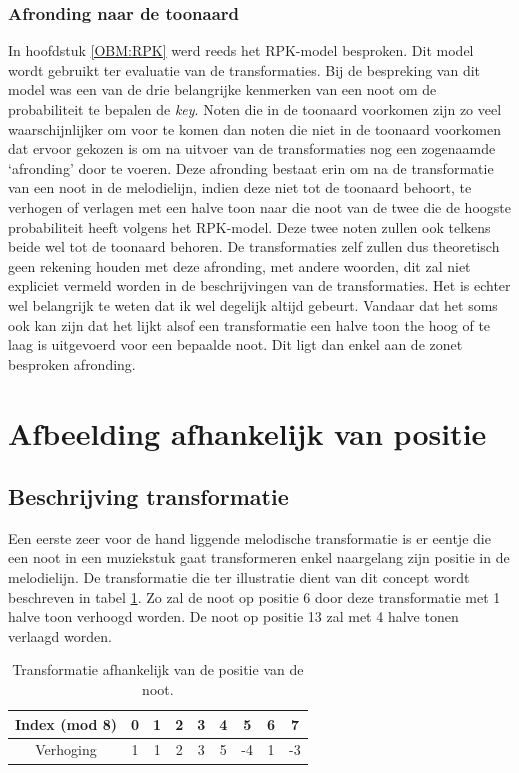 \subsubsection{Afronding naar de toonaard}
\label{sub:afronding}
In hoofdstuk \ref{OBM:RPK} werd reeds het RPK-model besproken. Dit model wordt gebruikt ter evaluatie van de transformaties. Bij de bespreking van dit model was een van de drie belangrijke kenmerken van een noot om de probabiliteit te bepalen de \textit{key}. Noten die in de toonaard voorkomen zijn zo veel waarschijnlijker om voor te komen dan noten die niet in de toonaard voorkomen dat ervoor gekozen is om na uitvoer van de transformaties nog een zogenaamde `afronding' door te voeren. Deze afronding bestaat erin om na de transformatie van een noot in de melodielijn, indien deze niet tot de toonaard behoort, te verhogen of verlagen met een halve toon naar die noot van de twee die de hoogste probabiliteit heeft volgens het RPK-model. Deze twee noten zullen ook telkens beide wel tot de toonaard behoren. De transformaties zelf zullen dus theoretisch geen rekening houden met deze afronding, met andere woorden, dit zal niet expliciet vermeld worden in de beschrijvingen van de transformaties. Het is echter wel belangrijk te weten dat ik wel degelijk altijd gebeurt. Vandaar dat het soms ook kan zijn dat het lijkt alsof een transformatie een halve toon the hoog of te laag is uitgevoerd voor een bepaalde noot. Dit ligt dan enkel aan de zonet besproken afronding.

\section{Afbeelding afhankelijk van positie}
\label{MT:positie}
\subsection{Beschrijving transformatie}
Een eerste zeer voor de hand liggende melodische transformatie is er eentje die een noot in een muziekstuk gaat transformeren enkel naargelang zijn positie in de melodielijn. De transformatie die ter illustratie dient van dit concept wordt beschreven in tabel \ref{tabel:transformatie1}. Zo zal de noot op positie 6 door deze transformatie met 1 halve toon verhoogd worden. De noot op positie 13 zal met 4 halve tonen verlaagd worden. 

\begin{table}
  \centering
  \begin{tabular}{c | c c c c c c c c }
    Index (mod 8) & 0 & 1 & 2 & 3 & 4 & 5 & 6 & 7 \\
    \hline
    \hline
    Verhoging & 1 & 1 & 2 & 3 & 5 & -4 & 1 & -3 \\
  \end{tabular}
  \caption{Transformatie afhankelijk van de positie van de noot.}
  \label{tabel:transformatie1}
\end{table}

